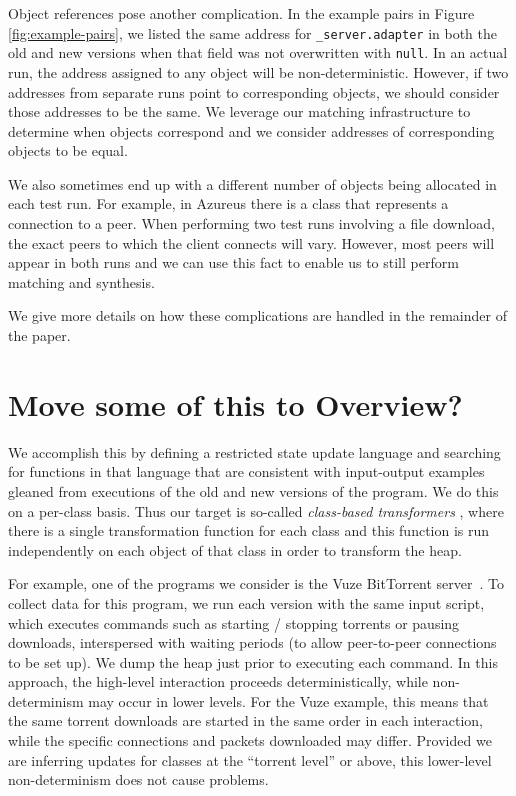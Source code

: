 Object references pose another complication.  In the example pairs in
Figure \ref{fig:example-pairs}, we listed the same address for
\texttt{\_server.adapter} in both the old and new versions when that
field was not overwritten with \texttt{null}.  In an actual run, the
address assigned to any object will be non-deterministic.  However, if
two addresses from separate runs point to corresponding objects, we
should consider those addresses to be the same.  We leverage our
matching infrastructure to determine when objects correspond and we
consider addresses of corresponding objects to be equal.

We also sometimes end up with a different number of objects being
allocated in each test run.  For example, in Azureus there is a class
that represents a connection to a peer.  When performing two test runs
involving a file download, the exact peers to which the client
connects will vary.  However, most peers will appear in both runs and
we can use this fact to enable us to still perform matching and
synthesis.

We give more details on how these complications are handled in the
remainder of the paper.

\section{Move some of this to Overview?}

We accomplish this by defining a restricted state update language and
searching for functions in that language that are consistent with
input-output examples gleaned from executions of the old and new
versions of the program.  We do this on a per-class basis.  Thus our
target is so-called \emph{class-based transformers} , where there is a single transformation
function for each class and this function is run independently on each
object of that class in order to transform the heap.  

For example, one of the programs we consider is the Vuze BitTorrent
server~\cite{vuze}.  To collect data for this program, we run each
version with the same input script, which executes commands such as starting
/ stopping torrents or pausing downloads, interspersed with
waiting periods (to allow peer-to-peer connections to be set up).  We
dump the heap just prior to executing each command.  In this approach,
the high-level interaction proceeds deterministically, while
non-determinism may occur in lower levels.  For the Vuze example, this
means that the same torrent downloads are started in the same order in
each interaction, while the specific connections and packets
downloaded may differ.  Provided we are inferring updates for classes
at the ``torrent level'' or above, this lower-level non-determinism
does not cause problems.

